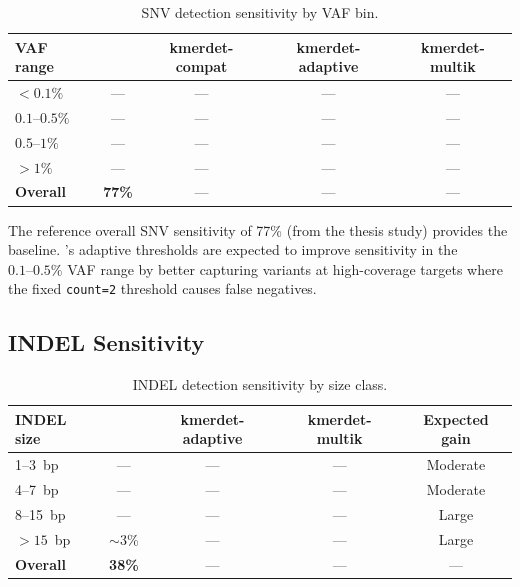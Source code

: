 \begin{table}[h]
  \centering
  \caption{SNV detection sensitivity by VAF bin.
    }
  \label{tab:snv-sensitivity}
  \begin{tabular}{lcccc}
    \toprule
    VAF range & \km{} & kmerdet-compat & kmerdet-adaptive & kmerdet-multik \\
    \midrule
    $<0.1\%$ & --- & --- & --- & --- \\
    $0.1\text{--}0.5\%$ & --- & --- & --- & --- \\
    $0.5\text{--}1\%$ & --- & --- & --- & --- \\
    $>1\%$ & --- & --- & --- & --- \\
    \textbf{Overall} & \textbf{77\%} & --- & --- & --- \\
    \bottomrule
  \end{tabular}
\end{table}

The reference \km{} overall SNV sensitivity of 77\% (from the thesis study)
provides the baseline.  \kmerdet{}'s adaptive thresholds are expected to
improve sensitivity in the $0.1\text{--}0.5\%$ VAF range by better capturing
variants at high-coverage targets where the fixed \texttt{count=2} threshold
causes false negatives.

\subsection{INDEL Sensitivity}
\label{sec:results-indel}


\begin{table}[h]
  \centering
  \caption{INDEL detection sensitivity by size class.
    }
  \label{tab:indel-sensitivity}
  \begin{tabular}{lcccc}
    \toprule
    INDEL size & \km{} & kmerdet-adaptive & kmerdet-multik & Expected gain \\
    \midrule
    1--3~bp & --- & --- & --- & Moderate \\
    4--7~bp & --- & --- & --- & Moderate \\
    8--15~bp & --- & --- & --- & Large \\
    $>15$~bp & $\sim$3\% & --- & --- & Large \\
    \textbf{Overall} & \textbf{38\%} & --- & --- & --- \\
    \bottomrule
  \end{tabular}
\end{table}

